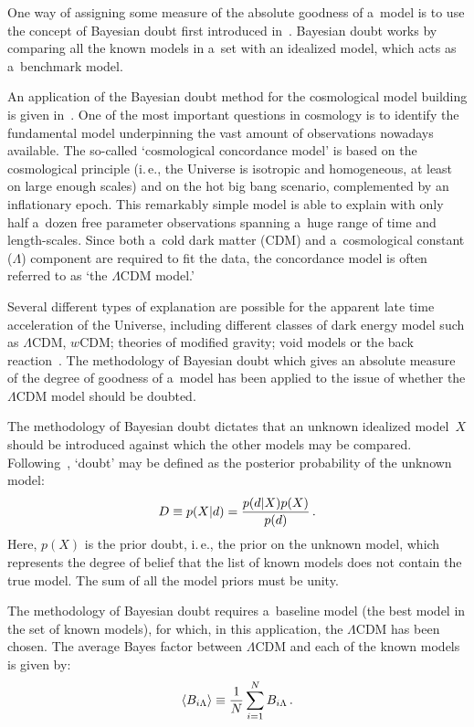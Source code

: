 \begin{multicols}{2}
  One way of assigning some measure of the absolute goodness of a~model is
  to use the concept of Bayesian doubt first introduced in~\cite{41-kl}. Bayesian doubt
works by comparing all the known models in a~set with an idealized model, which acts as a~benchmark model.

  An application of the Bayesian doubt method for the cosmological model building
  is given in~\cite{32-kl, 42-kl}. One of the most important questions in cosmology is to identify the fundamental model underpinning the vast amount of observations nowadays available. The so-called `cosmological concordance model' is based on the cosmological principle (i.\,e., the Universe is isotropic and homogeneous, at least on large enough scales) and on the hot big bang scenario, complemented by an inflationary epoch. This remarkably simple model is able to explain with only half a~dozen free parameter observations spanning
  a~huge range of time and length-scales.
Since both a~cold dark matter (CDM) and a~cosmological constant ($\Lambda$)
component are required to fit the data, the concordance model is often referred
to as `the $\Lambda$CDM model.'

   Several different types of explanation are possible for the apparent late time
acceleration of the Universe, including different classes of dark energy model such as $\Lambda$CDM, $w$CDM; theories of modified gravity; void models or the back reaction~\cite{32-kl}. The methodology of Bayesian doubt which gives an absolute measure of the degree of goodness of a~model has been applied to the issue of
whether the $\Lambda$CDM model should be doubted.

  The methodology of Bayesian doubt dictates that an unknown idealized
model~$X$ should be introduced against which the other models may be compared.
Following~\cite{41-kl}, `doubt' may be defined as the posterior probability of the unknown model:
  $$
  D \equiv  p(X\vert d) = \displaystyle\frac{\displaystyle p(d\vert X)p(X)\mathstrut}{\displaystyle p(d)\mathstrut}\,.
  $$
  Here, $p(X)$ is the prior doubt, i.\,e., the prior on the unknown model, which represents the degree of belief that the list of known models does not contain the true model. The sum of  all the model
  priors must be unity.

  The methodology of Bayesian doubt requires a~baseline model
  (the best model in the set of known models), for which, in this application,
  the $\Lambda$CDM has been chosen. The average Bayes factor
  between $\Lambda$CDM and each of the known models is given by:
  $$
  \langle B_{i\Lambda}\rangle \equiv \displaystyle\frac{\displaystyle 1\mathstrut}{\displaystyle N\mathstrut} \sum\limits_{i=1}^N
B_{i\Lambda}\,.
  $$


\end{multicols}
